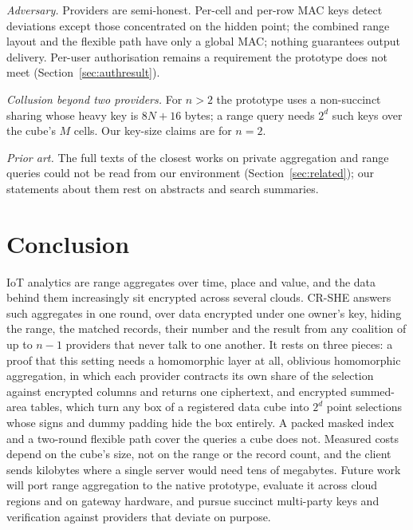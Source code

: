 \documentclass[a4paper,fleqn]{cas-sc}
\newif\ifanonymous
\begin{document}
\emph{Adversary.} Providers are semi-honest. Per-cell and per-row MAC keys
detect deviations except those concentrated on the hidden point; the combined
range layout and the flexible path have only a global MAC; nothing guarantees
output delivery. Per-user authorisation remains a requirement the prototype
does not meet (Section~\ref{sec:authresult}).

\emph{Collusion beyond two providers.} For $n>2$ the prototype uses a
non-succinct sharing whose heavy key is $8N+16$ bytes; a range query needs
$2^d$ such keys over the cube's $M$ cells. Our key-size claims are for $n=2$.

\emph{Prior art.} The full texts of the closest works on private aggregation
and range queries could not be read from our environment
(Section~\ref{sec:related}); our statements about them rest on abstracts and
search summaries.

\section{Conclusion}
\label{sec:conclusion}

IoT analytics are range aggregates over time, place and value, and the data
behind them increasingly sit encrypted across several clouds. CR-SHE answers
such aggregates in one round, over data encrypted under one owner's key,
hiding the range, the matched records, their number and the result from any
coalition of up to $n-1$ providers that never talk to one another. It rests on
three pieces: a proof that this setting needs a homomorphic layer at all,
oblivious homomorphic aggregation, in which each provider contracts its own
share of the selection against encrypted columns and returns one ciphertext,
and encrypted summed-area tables, which turn any box of a registered data cube
into $2^d$ point selections whose signs and dummy padding hide the box
entirely. A packed masked index and a two-round flexible path cover the
queries a cube does not. Measured costs depend on the cube's size, not on the
range or the record count, and the client sends kilobytes where a single
server would need tens of megabytes. Future work will port range aggregation to
the native prototype, evaluate it across cloud regions and on gateway
hardware, and pursue succinct multi-party keys and verification against
providers that deviate on purpose.

\ifanonymous\else\printcredits\fi
\end{document}
